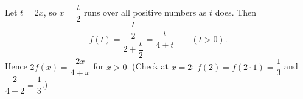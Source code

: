 Let $t=2x$, so $x=\dfrac {t}{2}$ runs over all positive numbers as $t$ does. Then
\[
f(t)=\dfrac{\dfrac {t}{2}}{2+\dfrac {t}{2}}=\dfrac{t}{4+t}\qquad(t>0).
\]
Hence $2f(x)=\boxed{\dfrac{2x}{4+x}}$ for $x>0$. (Check at $x=2$: $f(2)=f(2\cdot1)=\dfrac{1}{3}$ and $\dfrac{2}{4+2}=\dfrac{1}{3}$.)
